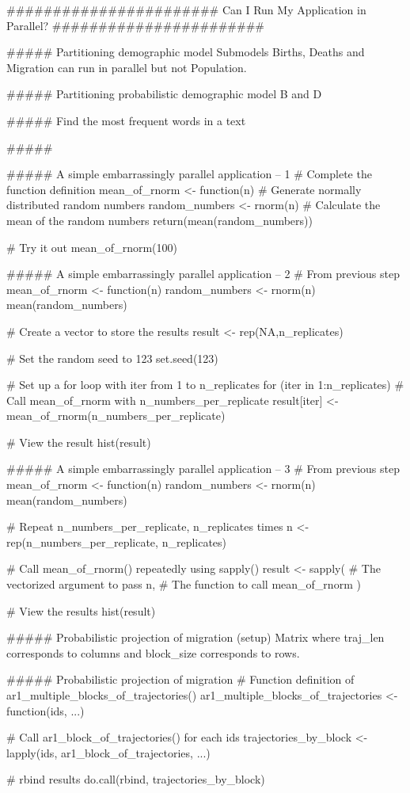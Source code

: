####################### Can I Run My Application in Parallel?   #######################

##### Partitioning demographic model
Submodels Births, Deaths and Migration can run in parallel but not Population.


##### Partitioning probabilistic demographic model
B and D


##### Find the most frequent words in a text



#####



##### A simple embarrassingly parallel application -- 1
# Complete the function definition
mean_of_rnorm <- function(n) {
  # Generate normally distributed random numbers
  random_numbers <- rnorm(n)
  # Calculate the mean of the random numbers
  return(mean(random_numbers))
}

# Try it out
mean_of_rnorm(100)


##### A simple embarrassingly parallel application -- 2
# From previous step
mean_of_rnorm <- function(n) {
  random_numbers <- rnorm(n)
  mean(random_numbers)
}

# Create a vector to store the results
result <- rep(NA,n_replicates)

# Set the random seed to 123
set.seed(123)

# Set up a for loop with iter from 1 to n_replicates
for (iter in 1:n_replicates) {
  # Call mean_of_rnorm with n_numbers_per_replicate
  result[iter] <- mean_of_rnorm(n_numbers_per_replicate)
}

# View the result
hist(result)



##### A simple embarrassingly parallel application -- 3
# From previous step
mean_of_rnorm <- function(n) {
  random_numbers <- rnorm(n)
  mean(random_numbers)
}

# Repeat n_numbers_per_replicate, n_replicates times
n <- rep(n_numbers_per_replicate, n_replicates)

# Call mean_of_rnorm() repeatedly using sapply()
result <- sapply(
  # The vectorized argument to pass
  n, 
  # The function to call
  mean_of_rnorm
)

# View the results
hist(result)


##### Probabilistic projection of migration (setup)
Matrix where traj_len corresponds to columns and block_size corresponds to rows.

##### Probabilistic projection of migration
# Function definition of ar1_multiple_blocks_of_trajectories()
ar1_multiple_blocks_of_trajectories <- function(ids, ...) {
  # Call ar1_block_of_trajectories() for each ids
  trajectories_by_block <- lapply(ids, ar1_block_of_trajectories, ...)
  
  # rbind results
  do.call(rbind, trajectories_by_block)
}

